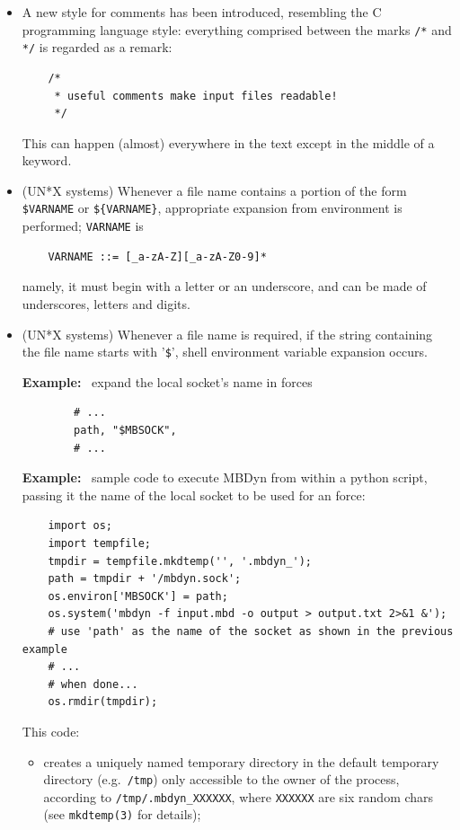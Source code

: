 \begin{itemize}
    \item A new style for comments has been introduced, resembling the 
    C programming language style: everything comprised between the marks
    \texttt{/*} and \texttt{*/} is regarded as a remark:
\begin{verbatim}
    /*
     * useful comments make input files readable!
     */
\end{verbatim}
    This can happen (almost) everywhere in the text except in the middle 
    of a keyword.
    
    \item (UN*X systems) Whenever a file name contains a portion
    of the form \verb;$VARNAME; or \verb;${VARNAME};, appropriate
    expansion from environment is performed; \verb;VARNAME; is
\begin{verbatim}
    VARNAME ::= [_a-zA-Z][_a-zA-Z0-9]*
\end{verbatim}
    namely, it must begin with a letter or an underscore, and can be
    made of underscores, letters and digits.

    \item (UN*X systems) Whenever a file name is required, if the string
    containing the file name starts with '\texttt{\$}', shell environment
    variable expansion occurs.

    \textbf{Example:} \
    expand the local socket's name in  forces
\begin{verbatim}
        # ...
        path, "$MBSOCK",
        # ...
\end{verbatim}

    \textbf{Example:} \
    sample code to execute MBDyn from within a python script,
    passing it the name of the local socket to be used
    for an \kw{external} force:
\begin{verbatim}
    import os;
    import tempfile;
    tmpdir = tempfile.mkdtemp('', '.mbdyn_');
    path = tmpdir + '/mbdyn.sock';
    os.environ['MBSOCK'] = path;
    os.system('mbdyn -f input.mbd -o output > output.txt 2>&1 &');
    # use 'path' as the name of the socket as shown in the previous example
    # ...
    # when done...
    os.rmdir(tmpdir);
\end{verbatim}
    This code:
    \begin{itemize}
    \item creates a uniquely named temporary directory
    in the default temporary directory (e.g.\ \texttt{/tmp})
    only accessible to the owner of the process, according
    to \texttt{/tmp/.mbdyn\_XXXXXX}, where \texttt{XXXXXX}
    are six random chars (see \texttt{mkdtemp(3)} for details);


\end{itemize}
\end{itemize}
